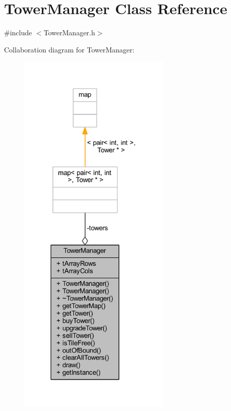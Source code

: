 \hypertarget{class_tower_manager}{\section{Tower\+Manager Class Reference}
\label{class_tower_manager}
}


{\ttfamily \#include $<$Tower\+Manager.\+h$>$}



Collaboration diagram for Tower\+Manager\+:
\nopagebreak
\begin{figure}[H]
\begin{center}
\leavevmode
\includegraphics[width=207pt]{class_tower_manager__coll__graph}
\end{center}
\end{figure}
